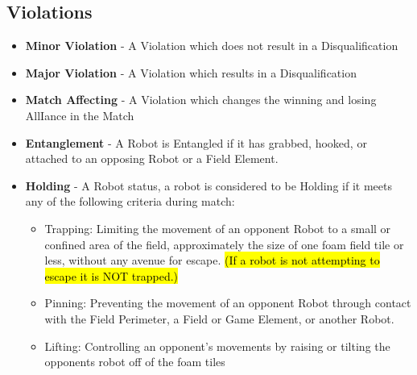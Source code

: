     \subsection*{Violations}
    \begin{itemize}
\item \textbf{Minor Violation} - A Violation which does not result in a Disqualification

\item \textbf{Major Violation} - A Violation which results in a Disqualification

\item \textbf{Match Affecting} - A Violation which changes the winning and losing AllIance in the Match 

\item \textbf{Entanglement} - A Robot is Entangled if it has grabbed, hooked, or attached to an opposing Robot or a Field Element.

\item \textbf{Holding} - A Robot status, a robot is considered to be Holding if it meets any of the following criteria during match:
\begin{itemize}
    \item Trapping: Limiting the movement of an opponent Robot to a small or confined area of the field, approximately the size of one foam field tile or less, without any avenue for escape. \hl{(If a robot is not attempting to escape it is NOT trapped.)}
    \item Pinning: Preventing the movement of an opponent Robot through contact with the Field Perimeter, a Field or Game Element, or another Robot.
    \item Lifting: Controlling an opponent's movements by raising or tilting the opponents robot off of the foam tiles 
\end{itemize}
    \end{itemize}
